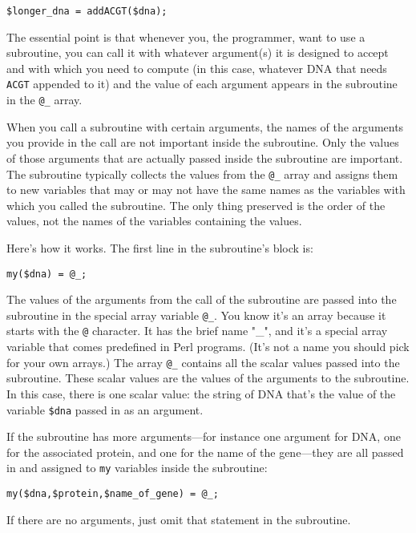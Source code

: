 \begin{lstlisting}
$longer_dna = addACGT($dna);
\end{lstlisting}

The essential point is that whenever you, the programmer, want to use a subroutine, you can call it with whatever argument(s) it is designed to accept and with which you need to compute (in this case, whatever DNA that needs \verb|ACGT| appended to it) and the value of each argument appears in the subroutine in the \verb|@_| array.

When you call a subroutine with certain arguments, the names of the arguments you provide in the call are not important inside the subroutine. Only the values of those arguments that are actually passed inside the subroutine are important. The subroutine typically collects the values from the \verb|@_| array and assigns them to new variables that may or may not have the same names as the variables with which you called the subroutine. The only thing preserved is the order of the values, not the names of the variables containing the values.

Here's how it works. The first line in the subroutine's block is:

\begin{lstlisting}
my($dna) = @_; 
\end{lstlisting}

The values of the arguments from the call of the subroutine are passed into the subroutine in the special array variable \verb|@_|. You know it's an array because it starts with the \verb|@| character. It has the brief name "\_", and it's a special array variable that comes predefined in Perl programs. (It's not a name you should pick for your own arrays.) The array \verb|@_| contains all the scalar values passed into the subroutine. These scalar values are the values of the arguments to the subroutine. In this case, there is one scalar value: the string of DNA that's the value of the variable \verb|$dna| passed in as an argument.

If the subroutine has more arguments—for instance one argument for DNA, one for the associated protein, and one for the name of the gene—they are all passed in and assigned to \verb|my| variables inside the subroutine:

\begin{lstlisting}
my($dna,$protein,$name_of_gene) = @_;
\end{lstlisting}

If there are no arguments, just omit that statement in the subroutine.

